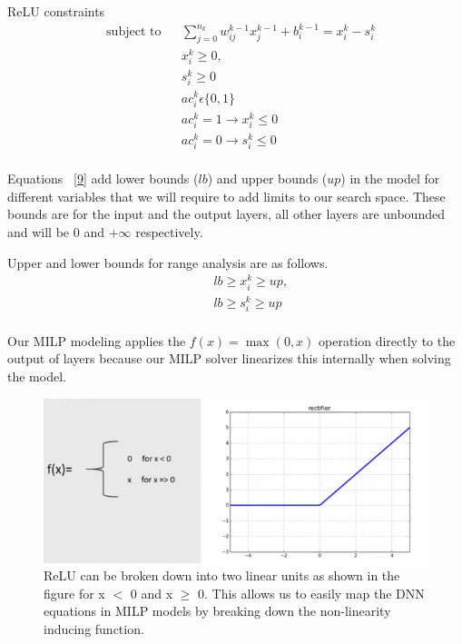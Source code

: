 ReLU constraints
\begin{equation}
\label{8}
\begin{aligned}
& \text{subject to} & &  \sum_{j=0}^{n_k} w_{ij}^{k-1}x_{j}^{k-1} + b_i^{k-1} = x_i^k - s_i^k  \\
& & & x_i^k \geq 0, \\
& & & s_i^k \geq 0 \\
& & & ac_i^k  \epsilon  \{0,1\} \\
& & & ac_i^k  =  1 \rightarrow  x_i^k \leq 0  \\
& & & ac_i^k =  0 \rightarrow s_i^k  \leq 0   \\
\end{aligned}
\end{equation}

Equations ~\ref{9} add lower bounds ($lb$) and upper bounds ($up$) in the  model for different variables that we will  require to add limits to our search space. 
These bounds are for the input and the output layers, all other layers are unbounded and will be 0 and $+\infty$ respectively. 
 
Upper and lower bounds for range analysis are as follows.
\begin{equation}
\label{9}
\begin{aligned}
& & & lb \geq x_i^k \geq up, \\
& & &  lb \geq s_i^k \geq up \\
\end{aligned}
\end{equation}








Our MILP modeling applies the $f(x) = \max(0, x)$ operation directly to the output of layers because our MILP solver linearizes this internally when solving the model.





\begin{figure}
	\centering
	\includegraphics[width=0.7\linewidth]{Images/ReLUbreakdown}
	\caption{ReLU can be broken down into two linear units as shown in the figure for x $<$ 0 and x $\geq$ 0. This allows us to easily map the DNN equations in MILP models by breaking down the non-linearity inducing function.}
	\label{fig:relubreakdown}
\end{figure}

